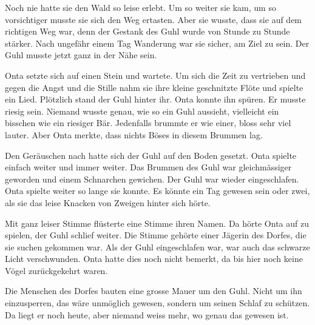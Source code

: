 \begin{swb}
Noch nie hatte sie den Wald so leise erlebt. Um so weiter sie kam, um so vorsichtiger musste sie sich den Weg ertasten. Aber sie wusste, dass sie auf dem richtigen Weg war, denn der Gestank des Guhl wurde von Stunde zu Stunde stärker. Nach ungefähr einem Tag Wanderung war sie sicher, am Ziel zu sein. Der Guhl musste jetzt ganz in der Nähe sein.

Onta setzte sich auf einen Stein und wartete. Um sich die Zeit zu vertrieben und gegen die Angst und die Stille nahm sie ihre kleine geschnitzte Flöte und spielte ein Lied. Plötzlich stand der Guhl hinter ihr. Onta konnte ihn spüren. Er musste riesig sein. Niemand wusste genau, wie so ein Guhl aussieht, vielleicht ein bisschen wie ein riesiger Bär. Jedenfalls brummte er wie einer, bloss sehr viel lauter. Aber Onta merkte, dass nichts Böses in diesem Brummen lag. 

Den Geräuschen nach hatte sich der Guhl auf den Boden gesetzt. Onta spielte einfach weiter und immer weiter. Das Brummen des Guhl war gleichmässiger geworden und einem Schnarchen gewichen. Der Guhl war wieder eingeschlafen. Onta spielte weiter so lange sie konnte. Es könnte ein Tag gewesen sein oder zwei, als sie das leise Knacken von Zweigen hinter sich hörte.

Mit ganz leiser Stimme flüsterte eine Stimme ihren Namen. Da hörte Onta auf zu spielen, der Guhl schlief weiter. Die Stimme gehörte einer Jägerin des Dorfes, die sie suchen gekommen war. Als der Guhl eingeschlafen war, war auch das schwarze Licht verschwunden. Onta hatte dies noch nicht bemerkt, da bis hier noch keine Vögel zurückgekehrt waren.

Die Menschen des Dorfes bauten eine grosse Mauer um den Guhl. Nicht um ihn einzusperren, das wäre unmöglich gewesen, sondern um seinen Schlaf zu schützen. Da liegt er noch heute, aber niemand weiss mehr, wo genau das gewesen ist. \end{swb}\hfill {\color{red}\decofourleft}
